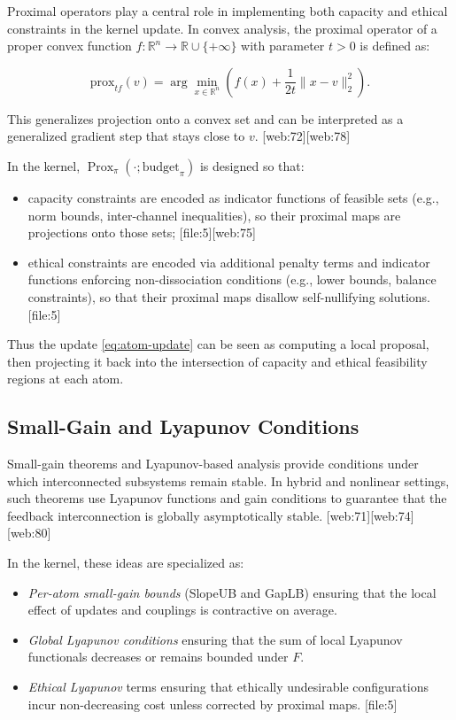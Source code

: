 \documentclass[11pt]{article}
\begin{document}
Proximal operators play a central role in implementing both capacity and ethical constraints in the kernel update. In convex analysis, the proximal operator of a proper convex function \(f:\mathbb{R}^n\to \mathbb{R}\cup\{+\infty\}\) with parameter \(t>0\) is defined as:

\[
  \text{prox}_{t f}(v) = \arg\min_{x\in\mathbb{R}^n} \left( f(x) + \frac{1}{2t}\|x - v\|_2^2 \right).
\]

This generalizes projection onto a convex set and can be interpreted as a generalized gradient step that stays close to \(v\). [web:72][web:78]

In the kernel, \(\operatorname{Prox}_\pi(\cdot;\text{budget}_\pi)\) is designed so that:

\begin{itemize}[leftmargin=*]
  \item capacity constraints are encoded as indicator functions of feasible sets (e.g., norm bounds, inter-channel inequalities), so their proximal maps are projections onto those sets; [file:5][web:75]
  \item ethical constraints are encoded via additional penalty terms and indicator functions enforcing non-dissociation conditions (e.g., lower bounds, balance constraints), so that their proximal maps disallow self-nullifying solutions. [file:5]
\end{itemize}

Thus the update \eqref{eq:atom-update} can be seen as computing a local proposal, then projecting it back into the intersection of capacity and ethical feasibility regions at each atom.

\subsection{Small-Gain and Lyapunov Conditions}

Small-gain theorems and Lyapunov-based analysis provide conditions under which interconnected subsystems remain stable. In hybrid and nonlinear settings, such theorems use Lyapunov functions and gain conditions to guarantee that the feedback interconnection is globally asymptotically stable. [web:71][web:74][web:80]

In the kernel, these ideas are specialized as:

\begin{itemize}[leftmargin=*]
  \item \emph{Per-atom small-gain bounds} (SlopeUB and GapLB) ensuring that the local effect of updates and couplings is contractive on average.
  \item \emph{Global Lyapunov conditions} ensuring that the sum of local Lyapunov functionals decreases or remains bounded under \(F\).
  \item \emph{Ethical Lyapunov} terms ensuring that ethically undesirable configurations incur non-decreasing cost unless corrected by proximal maps. [file:5]
\end{itemize}
\end{document}
